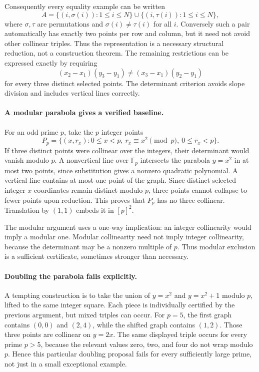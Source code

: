 \documentclass[11pt,a4paper]{article}
\newcommand{\F}{\mathbb{F}}
\begin{document}
Consequently every equality example can be written
\[
 A=\{(i,\sigma(i)):1\leq i\leq N\}
   \cup\{(i,\tau(i)):1\leq i\leq N\},
\]
where $\sigma,\tau$ are permutations and $\sigma(i)\ne\tau(i)$ for all $i$. Conversely such a pair automatically has exactly two points per row and column, but it need not avoid other collinear triples. Thus the representation is a necessary structural reduction, not a construction theorem. The remaining restrictions can be expressed exactly by requiring
\[
 (x_2-x_1)(y_3-y_1)\ne(x_3-x_1)(y_2-y_1)
\]
for every three distinct selected points. The determinant criterion avoids slope division and includes vertical lines correctly.

\paragraph{A modular parabola gives a verified baseline.}
For an odd prime $p$, take the $p$ integer points
\[
 P_p=\{(x,r_x):0\leq x<p,\ r_x\equiv x^2\pmod p,
                         \ 0\leq r_x<p\}.
\]
If three distinct points were collinear over the integers, their determinant would vanish modulo $p$. A nonvertical line over $\F_p$ intersects the parabola $y=x^2$ in at most two points, since substitution gives a nonzero quadratic polynomial. A vertical line contains at most one point of the graph. Since distinct selected integer $x$-coordinates remain distinct modulo $p$, three points cannot collapse to fewer points upon reduction. This proves that $P_p$ has no three collinear. Translation by $(1,1)$ embeds it in $[p]^2$.

The modular argument uses a one-way implication: an integer collinearity would imply a modular one. Modular collinearity need not imply integer collinearity, because the determinant may be a nonzero multiple of $p$. Thus modular exclusion is a sufficient certificate, sometimes stronger than necessary.

\paragraph{Doubling the parabola fails explicitly.}
A tempting construction is to take the union of $y=x^2$ and $y=x^2+1$ modulo $p$, lifted to the same integer square. Each piece is individually certified by the previous argument, but mixed triples can occur. For $p=5$, the first graph contains $(0,0)$ and $(2,4)$, while the shifted graph contains $(1,2)$. Those three points are collinear on $y=2x$. The same displayed triple occurs for every prime $p>5$, because the relevant values zero, two, and four do not wrap modulo $p$. Hence this particular doubling proposal fails for every sufficiently large prime, not just in a small exceptional example.
\end{document}
